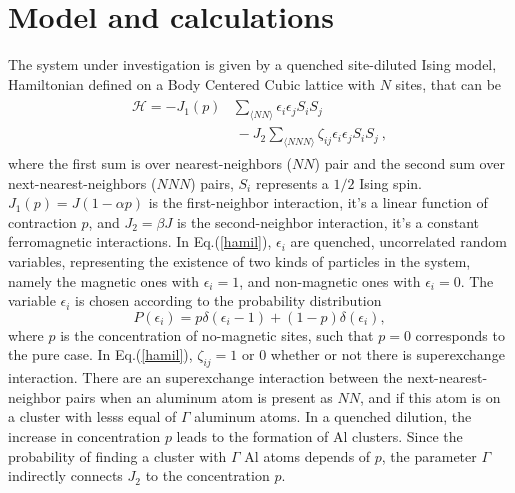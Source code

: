 \documentclass[twocolumn,5p,12pt]{elsarticle}
\begin{document}
\section{Model and calculations}
The system under investigation is given by a quenched site-diluted Ising model, Hamiltonian defined on a Body Centered Cubic lattice with $N$ sites, that can be
\begin{eqnarray}\label{hamil}
\begin{split}
\mathcal{H} =-J_1(p)&\sum_{\langle NN\rangle} \epsilon_i \epsilon_jS_{i}S_{j} \\& ~- J_{2}\sum_{\langle NNN \rangle}\zeta_{ij}  \epsilon_i \epsilon_j S_{i}S_{j}
~,
\end{split}
\end{eqnarray}
%
where the first sum is over nearest-neighbors ($NN$) pair and the second sum over next-nearest-neighbors ($NNN$) pairs, $S_i$ represents a $1/2$ Ising spin. $J_1(p)=J(1- \alpha p)$ is the first-neighbor interaction, it’s a linear function of contraction $p$, and $J_2=\beta J$ is the second-neighbor interaction, it’s a constant ferromagnetic interactions. In Eq.(\ref{hamil}), $\epsilon_i$ are quenched, uncorrelated random variables, representing the existence of two kinds of particles in the system, namely the magnetic ones with $\epsilon_i=1$, and non-magnetic ones with $\epsilon_i=0$. The variable $\epsilon_i$ is chosen according to the probability distribution
%
\begin{equation}
P(\epsilon_i) = p\delta(\epsilon_i-1) + (1-p)\delta(\epsilon_i),
\label{pro}
\end{equation}
%
where $p$ is the concentration of no-magnetic sites, such that $p = 0$ corresponds to the pure case. In Eq.(\ref{hamil}),  $\zeta_{ij}=1$ or $0$ whether or not there is superexchange interaction. There are an superexchange interaction between the next-nearest-neighbor pairs when an aluminum atom is present as $NN$, and if this atom is on a cluster with lesss equal of $\Gamma$ aluminum atoms. In a quenched dilution, the increase in concentration $p$ leads to the formation of Al clusters. Since the probability of finding a cluster with $\Gamma$ Al atoms depends of $p$, the parameter $\Gamma$ indirectly connects $J_2$ to the concentration $p$.
\end{document}
